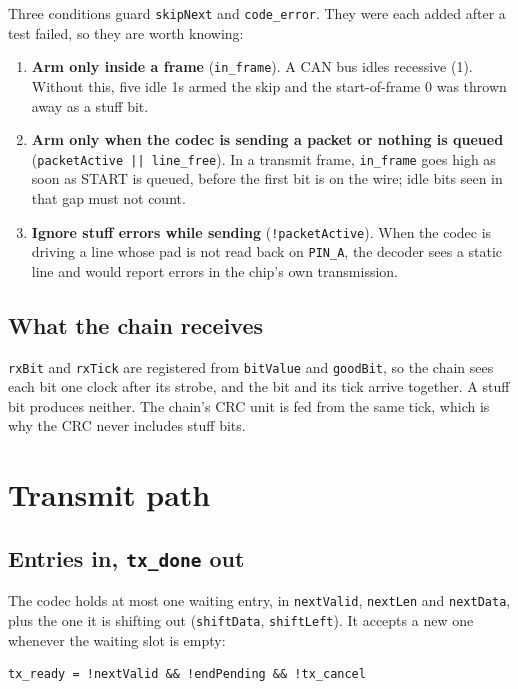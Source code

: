 \documentclass[11pt,a4paper]{article}
\newcommand{\sig}[1]{\texttt{#1}}
\begin{document}
Three conditions guard \sig{skipNext} and \sig{code\_error}. They were each added after a test failed, so they are worth knowing:

\begin{enumerate}
\item \textbf{Arm only inside a frame} (\sig{in\_frame}). A CAN bus idles recessive (1). Without this, five idle 1s armed the skip and the start-of-frame 0 was thrown away as a stuff bit.
\item \textbf{Arm only when the codec is sending a packet or nothing is queued} (\sig{packetActive || line\_free}). In a transmit frame, \sig{in\_frame} goes high as soon as START is queued, before the first bit is on the wire; idle bits seen in that gap must not count.
\item \textbf{Ignore stuff errors while sending} (\sig{!packetActive}). When the codec is driving a line whose pad is not read back on \sig{PIN\_A}, the decoder sees a static line and would report errors in the chip's own transmission.
\end{enumerate}

\subsection{What the chain receives}

\sig{rxBit} and \sig{rxTick} are registered from \sig{bitValue} and \sig{goodBit}, so the chain sees each bit one clock after its strobe, and the bit and its tick arrive together. A stuff bit produces neither. The chain's CRC unit is fed from the same tick, which is why the CRC never includes stuff bits.

\section{Transmit path}

\subsection{Entries in, \sig{tx\_done} out}

The codec holds at most one waiting entry, in \sig{nextValid}, \sig{nextLen} and \sig{nextData}, plus the one it is shifting out (\sig{shiftData}, \sig{shiftLeft}). It accepts a new one whenever the waiting slot is empty:

\begin{lstlisting}
tx_ready = !nextValid && !endPending && !tx_cancel
\end{lstlisting}
\end{document}
